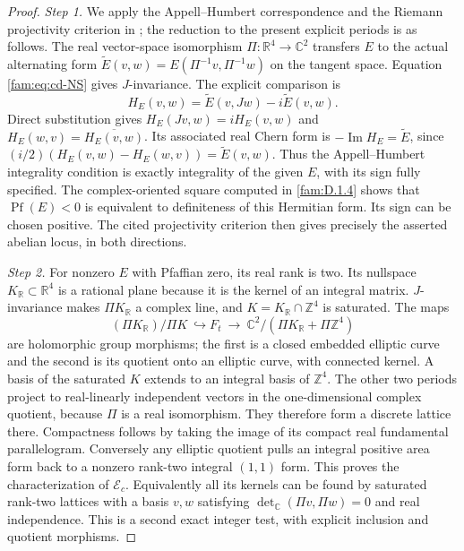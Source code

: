 \begin{proof}
\par\noindent\textit{Step 1.} We apply the Appell--Humbert correspondence and the Riemann projectivity
criterion in \cite[Theorems 4.1 and 4.4]{Schnell19}; the reduction to the
present explicit periods is as follows. The real vector-space isomorphism
$\Pi:\mathbb R^4\to\mathbb C^2$ transfers $E$ to the actual alternating
form $\widetilde E(v,w)=E(\Pi^{-1}v,\Pi^{-1}w)$ on the tangent space.
Equation \eqref{fam:eq:cd-NS} gives $J$-invariance. The explicit comparison is
\[
 H_E(v,w)=\widetilde E(v,Jw)-i\widetilde E(v,w).
\]
Direct substitution gives $H_E(Jv,w)=iH_E(v,w)$ and
$H_E(w,v)=\overline{H_E(v,w)}$. Its associated real Chern form is
$-\operatorname{Im}H_E=\widetilde E$, since
$(i/2)(H_E(v,w)-H_E(w,v))=\widetilde E(v,w)$.
Thus the Appell--Humbert integrality condition is exactly integrality
of the given $E$, with its sign fully specified. The complex-oriented square computed in \ref{fam:D.1.4} shows that
$\operatorname{Pf}(E)<0$ is equivalent to definiteness of this Hermitian
form. Its sign can be chosen positive. The cited projectivity criterion
then gives precisely the asserted abelian locus, in both directions.

\par\noindent\textit{Step 2.} For nonzero $E$ with Pfaffian zero, its real rank is two. Its nullspace
$K_{\mathbb R}\subset\mathbb R^4$ is a rational plane because it is the
kernel of an integral matrix. $J$-invariance makes $\Pi K_{\mathbb R}$ a
complex line, and $K=K_{\mathbb R}\cap\mathbb Z^4$ is saturated. The maps
\[
 (\Pi K_{\mathbb R})/\Pi K\ \hookrightarrow F_t
 \ \longrightarrow\
 \mathbb C^2/(\Pi K_{\mathbb R}+\Pi\mathbb Z^4)
\]
are holomorphic group morphisms; the first is a closed embedded elliptic
curve and the second is its quotient onto an elliptic curve, with
connected kernel. A basis of the saturated $K$ extends to an integral basis of $\mathbb Z^4$.
The other two periods project to real-linearly independent vectors in the
one-dimensional complex quotient, because $\Pi$ is a real isomorphism.
They therefore form a discrete lattice there. Compactness follows by
taking the image of its compact real fundamental parallelogram. Conversely any elliptic quotient
pulls an integral positive area form back to a nonzero rank-two integral
$(1,1)$ form. This proves the characterization of $\mathcal E_c$.
Equivalently all its kernels can be found by saturated rank-two lattices
with a basis $v,w$ satisfying
$\det_{\mathbb C}(\Pi v,\Pi w)=0$ and real independence. This is a second
exact integer test, with explicit inclusion and quotient morphisms.


\end{proof}
